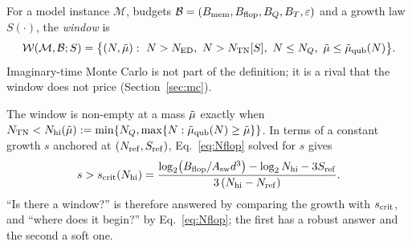 \begin{defn}[Window]\label{def:window}
For a model instance $\mathcal M$, budgets $\mathcal B=(B_{\mathrm{mem}},B_{\mathrm{flop}},B_{Q},B_{T},\varepsilon)$ and a growth law $S(\cdot)$, the \emph{window} is
\[
\Win(\mathcal M,\mathcal B;S)=\big\{(N,\mut):\ N>\NED,\ N>\NTN[S],\ N\le\NQ,\ \mut\le\mutq(N)\big\}.
\]
Imaginary-time Monte Carlo is not part of the definition; it is a rival that the window does not price (Section~\ref{sec:mc}).
\end{defn}
The window is non-empty at a mass $\tilde{\mu}$ exactly when $N_{\mathrm{TN}}<N_{\rm hi}(\tilde{\mu}):=\min\{N_{Q},\max\{N:\tilde\mu_{\mathrm{qub}}(N)\ge\tilde{\mu}\}\}$. In terms of a constant growth $s$ anchored at $(N_{\rm ref},S_{\rm ref})$, Eq.~\eqref{eq:Nflop} solved for $s$ gives
\begin{equation}
s>s_{\rm crit}(N_{\rm hi})=\frac{\log_2\!\big(B_{\mathrm{flop}}/A_{\rm sw}d^3\big)-\log_2N_{\rm hi}-3S_{\rm ref}}{3\,(N_{\rm hi}-N_{\rm ref})}.
\label{eq:scrit}
\end{equation}
``Is there a window?'' is therefore answered by comparing the growth with $s_{\rm crit}$, and ``where does it begin?'' by Eq.~\eqref{eq:Nflop}; the first has a robust answer and the second a soft one.
